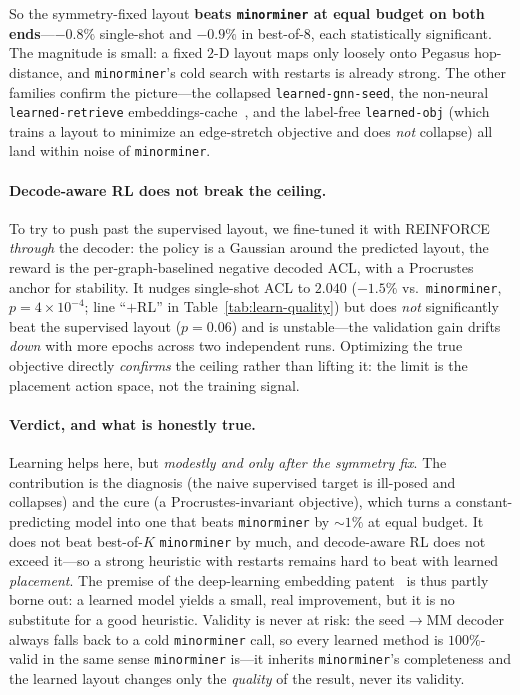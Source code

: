 \documentclass[acmsmall,anonymous,nonacm]{acmart}
\begin{document}
So the symmetry-fixed layout \textbf{beats \texttt{minorminer} at equal budget on both
ends}---$-0.8\%$ single-shot and $-0.9\%$ in best-of-$8$, each statistically
significant. The magnitude is small: a fixed $2$-D layout maps only loosely onto
Pegasus hop-distance, and \texttt{minorminer}'s cold search with restarts is already
strong. The other families confirm the picture---the collapsed \texttt{learned-gnn-seed},
the non-neural \texttt{learned-retrieve} embeddings-cache~\cite{brahm2021caching}, and the label-free
\texttt{learned-obj} (which trains a layout to minimize an edge-stretch objective and
does \emph{not} collapse) all land within noise of \texttt{minorminer}.

\paragraph{Decode-aware RL does not break the ceiling.} To try to push past the
supervised layout, we fine-tuned it with REINFORCE \emph{through} the decoder: the
policy is a Gaussian around the predicted layout, the reward is the per-graph-baselined
negative decoded ACL, with a Procrustes anchor for stability. It nudges single-shot ACL
to $2.040$ ($-1.5\%$ vs.\ \texttt{minorminer}, $p{=}4{\times}10^{-4}$; line ``$+$RL'' in
Table~\ref{tab:learn-quality}) but does \emph{not} significantly beat the supervised
layout ($p{=}0.06$) and is unstable---the validation gain drifts \emph{down} with more
epochs across two independent runs. Optimizing the true objective directly
\emph{confirms} the ceiling rather than lifting it: the limit is the placement action
space, not the training signal.

\paragraph{Verdict, and what is honestly true.} Learning helps here, but \emph{modestly
and only after the symmetry fix}. The contribution is the diagnosis (the naive
supervised target is ill-posed and collapses) and the cure (a Procrustes-invariant
objective), which turns a constant-predicting model into one that beats
\texttt{minorminer} by ${\sim}1\%$ at equal budget. It does not beat best-of-$K$
\texttt{minorminer} by much, and decode-aware RL does not exceed it---so a strong
heuristic with restarts remains hard to beat with learned \emph{placement}. The
premise of the deep-learning embedding patent~\cite{hyde2025dlembedding} is thus
partly borne out: a learned model yields a small, real
improvement, but it is no substitute for a good heuristic. Validity is never at risk:
the seed$\rightarrow$MM decoder always falls back to a cold \texttt{minorminer} call, so
every learned method is $100\%$-valid in the same sense \texttt{minorminer} is---it
inherits \texttt{minorminer}'s completeness and the learned layout changes only the
\emph{quality} of the result, never its validity.
\end{document}
